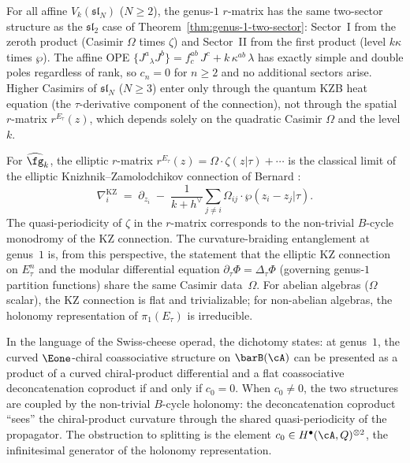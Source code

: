\begin{remark}
\label{rem:two-sector-all-slN}
For all affine $V_k(\mathfrak{sl}_N)$ ($N \ge 2$), the genus-$1$
$r$-matrix has the same two-sector structure as the
$\mathfrak{sl}_2$ case of Theorem~\ref{thm:genus-1-two-sector}:
Sector~I from the zeroth product (Casimir $\Omega$ times $\zeta$)
and Sector~II from the first product (level $k\kappa$ times $\wp$).
The affine OPE $\{J^a {}_\lambda J^b\} = f^{ab}_c\,J^c + k\,\kappa^{ab}\,\lambda$
has exactly simple and double poles regardless of rank, so $c_n = 0$
for $n \ge 2$ and no additional sectors arise.
Higher Casimirs of $\mathfrak{sl}_N$ ($N \ge 3$) enter only through
the quantum KZB heat equation (the $\tau$-derivative component of
the connection), not through the spatial $r$-matrix
$r^{E_\tau}(z)$, which depends solely on the quadratic Casimir
$\Omega$ and the level $k$.
\end{remark}

\begin{remark}
\label{rem:elliptic-KZ}
For $\widehat{\fg}_k$, the elliptic $r$-matrix
$r^{E_\tau}(z) = \Omega \cdot \zeta(z|\tau) + \cdots$
is the classical limit of the elliptic Knizhnik--Zamolodchikov
connection of Bernard \cite{Ber88}:
\[
\nabla_i^{\mathrm{KZ}}
\;=\;
\partial_{z_i}
\;-\;
\frac{1}{k + h^\vee}
\sum_{j \ne i}
 \Omega_{ij} \cdot \wp(z_i - z_j|\tau).
\]
The quasi-periodicity of $\zeta$ in the $r$-matrix
corresponds to the non-trivial $B$-cycle monodromy of
the KZ connection. The curvature-braiding entanglement
at genus~$1$ is, from this perspective, the statement
that the elliptic KZ connection on $E_\tau^n$ and the
modular differential equation
$\partial_\tau \Phi = \Delta_\tau \Phi$ (governing
genus-$1$ partition functions) share the same Casimir
data~$\Omega$. For abelian algebras ($\Omega$ scalar),
the KZ connection is flat and trivializable;
for non-abelian algebras, the holonomy representation
of $\pi_1(E_\tau)$ is irreducible.
\end{remark}

\begin{remark}
\label{rem:operadic-splitting}
In the language of the Swiss-cheese operad, the dichotomy
states: at genus~$1$, the curved $\Eone$-chiral coassociative
structure on $\barB(\cA)$ can be presented as a product of a
curved chiral-product differential and a flat coassociative
deconcatenation coproduct if and only if $c_0 = 0$. When
$c_0 \ne 0$, the two structures are coupled by the non-trivial
$B$-cycle holonomy: the deconcatenation coproduct ``sees''
the chiral-product curvature through the shared
quasi-periodicity of the propagator. The obstruction to splitting is the element
$c_0 \in H^\bullet(\cA,Q)^{\otimes 2}$, the infinitesimal
generator of the holonomy representation.
\end{remark}

